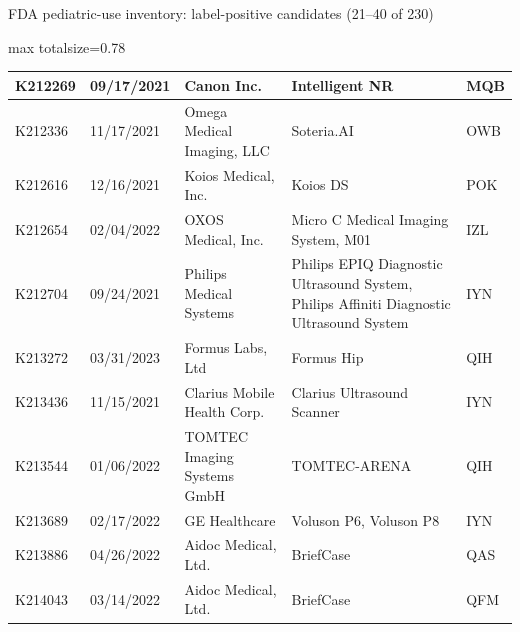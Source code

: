 \documentclass[aspectratio=169]{beamer}
\begin{document}
\begin{frame}[category=FDA appendix]{FDA pediatric-use inventory: label-positive candidates (21--40 of 230)}
\begin{adjustbox}{max totalsize={\textwidth}{0.78\textheight}}
\begin{tabular}{|p{}|p{}|p{}|p{}|p{}|}
K212269 & 09/17/2021 & Canon Inc. & Intelligent NR & MQB \\ \hline
K212336 & 11/17/2021 & Omega Medical Imaging, LLC & Soteria.AI & OWB \\ \hline
K212616 & 12/16/2021 & Koios Medical, Inc. & Koios DS & POK \\ \hline
K212654 & 02/04/2022 & OXOS Medical, Inc. & Micro C Medical Imaging System, M01 & IZL \\ \hline
K212704 & 09/24/2021 & Philips Medical Systems & Philips EPIQ Diagnostic Ultrasound System, Philips Affiniti Diagnostic Ultrasound System & IYN \\ \hline
K213272 & 03/31/2023 & Formus Labs, Ltd & Formus Hip & QIH \\ \hline
K213436 & 11/15/2021 & Clarius Mobile Health Corp. & Clarius Ultrasound Scanner & IYN \\ \hline
K213544 & 01/06/2022 & TOMTEC Imaging Systems GmbH & TOMTEC-ARENA & QIH \\ \hline
K213689 & 02/17/2022 & GE Healthcare & Voluson P6, Voluson P8 & IYN \\ \hline
K213886 & 04/26/2022 & Aidoc Medical, Ltd. & BriefCase & QAS \\ \hline
K214043 & 03/14/2022 & Aidoc Medical, Ltd. & BriefCase & QFM \\ \hline
\end{tabular}
\end{adjustbox}
\end{frame}
\end{document}
